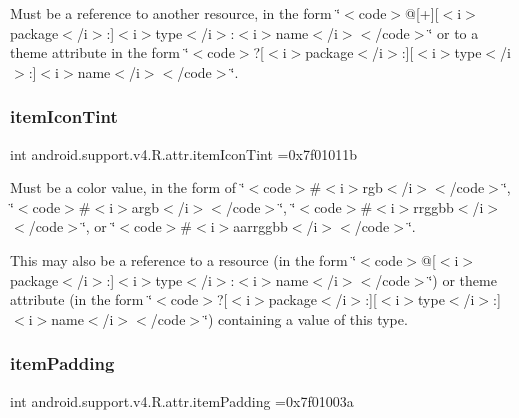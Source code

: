 Must be a reference to another resource, in the form \char`\"{}$<$code$>$@\mbox{[}+\mbox{]}\mbox{[}$<$i$>$package$<$/i$>$\+:\mbox{]}$<$i$>$type$<$/i$>$\+:$<$i$>$name$<$/i$>$$<$/code$>$\char`\"{} or to a theme attribute in the form \char`\"{}$<$code$>$?\mbox{[}$<$i$>$package$<$/i$>$\+:\mbox{]}\mbox{[}$<$i$>$type$<$/i$>$\+:\mbox{]}$<$i$>$name$<$/i$>$$<$/code$>$\char`\"{}. \mbox{\label{classandroid_1_1support_1_1v4_1_1R_1_1attr_a3a30b4e249ac1ab4d8711bf25d85e0fe}} 
\subsubsection{\texorpdfstring{item\+Icon\+Tint}{itemIconTint}}
{\footnotesize\ttfamily int android.\+support.\+v4.\+R.\+attr.\+item\+Icon\+Tint =0x7f01011b\hspace{0.3cm}{\ttfamily [static]}}

Must be a color value, in the form of \char`\"{}$<$code$>$\#$<$i$>$rgb$<$/i$>$$<$/code$>$\char`\"{}, \char`\"{}$<$code$>$\#$<$i$>$argb$<$/i$>$$<$/code$>$\char`\"{}, \char`\"{}$<$code$>$\#$<$i$>$rrggbb$<$/i$>$$<$/code$>$\char`\"{}, or \char`\"{}$<$code$>$\#$<$i$>$aarrggbb$<$/i$>$$<$/code$>$\char`\"{}. 

This may also be a reference to a resource (in the form \char`\"{}$<$code$>$@\mbox{[}$<$i$>$package$<$/i$>$\+:\mbox{]}$<$i$>$type$<$/i$>$\+:$<$i$>$name$<$/i$>$$<$/code$>$\char`\"{}) or theme attribute (in the form \char`\"{}$<$code$>$?\mbox{[}$<$i$>$package$<$/i$>$\+:\mbox{]}\mbox{[}$<$i$>$type$<$/i$>$\+:\mbox{]}$<$i$>$name$<$/i$>$$<$/code$>$\char`\"{}) containing a value of this type. \mbox{\label{classandroid_1_1support_1_1v4_1_1R_1_1attr_a62722269620cd4510318f4893382708c}} 
\subsubsection{\texorpdfstring{item\+Padding}{itemPadding}}
{\footnotesize\ttfamily int android.\+support.\+v4.\+R.\+attr.\+item\+Padding =0x7f01003a\hspace{0.3cm}{\ttfamily [static]}}

